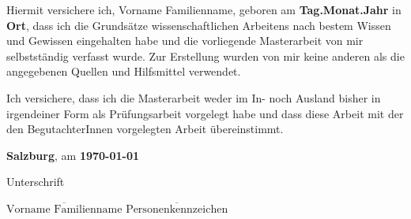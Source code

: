 
Hiermit versichere ich, Vorname Familienname, geboren am {\bf Tag.Monat.Jahr} in {\bf Ort}, dass ich die Grundsätze wissenschaftlichen Arbeitens nach bestem Wissen und Gewissen eingehalten habe und die vorliegende Masterarbeit von mir selbstständig verfasst wurde. Zur Erstellung wurden von mir keine anderen als die angegebenen Quellen und Hilfsmittel verwendet. 

Ich versichere, dass ich die Masterarbeit weder im In- noch Ausland bisher in irgendeiner Form als Prüfungsarbeit vorgelegt habe und dass diese Arbeit mit der den BegutachterInnen vorgelegten Arbeit übereinstimmt.


\vspace*{3cm}

{\bf Salzburg}, am {\bf \today}


\hfill


Unterschrift

\vspace*{1cm}

\hfill \imatrikel\hspace*{1cm}\newline
$\overline{\text{Vorname Familienname}}$ \hfill	$\overline{\text{Personenkennzeichen}}$